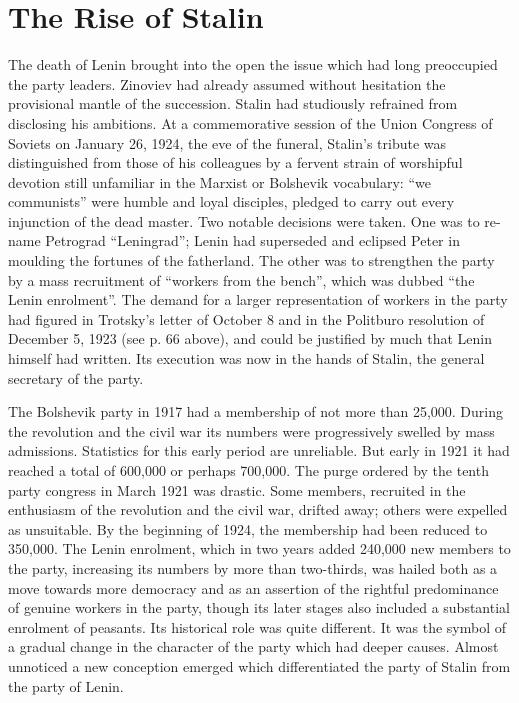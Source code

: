 \chapter{The Rise of Stalin}

The death of Lenin brought into the open the issue which had long preoccupied the party leaders. Zinoviev had already assumed without hesitation the provisional mantle of the succession. Stalin had studiously refrained from disclosing his ambitions. At a commemorative session of the Union Congress of Soviets on January 26, 1924, the eve of the funeral, Stalin's tribute was distinguished from those of his colleagues by a fervent strain of worshipful devotion still unfamiliar in the Marxist or Bolshevik vocabulary: ``we communists'' were humble and loyal disciples, pledged to carry out every injunction of the dead master. Two notable decisions were taken. One was to re-name Petrograd ``Leningrad''; Lenin had superseded and eclipsed Peter in moulding the fortunes of the fatherland. The other was to strengthen the party by a mass recruitment of ``workers from the bench'', which was dubbed ``the Lenin enrolment''. The demand for a larger representation of workers in the party had figured in Trotsky's letter of October 8 and in the Politburo resolution of December 5, 1923 (see p. 66 above), and could be justified by much that Lenin himself had written. Its execution was now in the hands of Stalin, the general secretary of the party. 

The Bolshevik party in 1917 had a membership of not more than 25,000. During the revolution and the civil war its numbers were progressively swelled by mass admissions. Statistics for this early period are unreliable. But early in 1921 it had reached a total of 600,000 or perhaps 700,000. The purge ordered by the tenth party congress in March 1921 was drastic. Some members, recruited in the enthusiasm of the revolution and the civil war, drifted away; others were expelled as unsuitable. By the beginning of 1924, the membership had been reduced to 350,000. The Lenin enrolment, which in two years added 240,000 new members to the party, increasing its numbers by more than two-thirds, was hailed both as a move towards more democracy and as an assertion of the rightful predominance of genuine workers in the party, though its later stages also included a substantial enrolment of peasants. Its historical role was quite different. It was the symbol of a gradual change in the character of the party which had deeper causes. Almost unnoticed a new conception emerged which differentiated the party of Stalin from the party of Lenin. 

